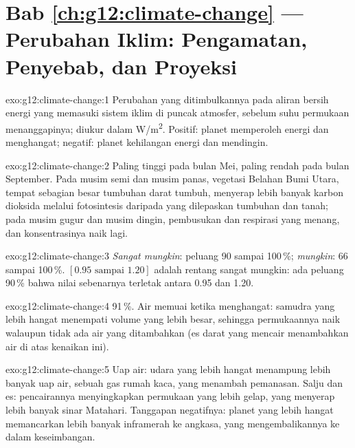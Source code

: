 \section*{Bab \ref{ch:g12:climate-change} --- Perubahan Iklim: Pengamatan, Penyebab, dan Proyeksi}

\begin{solution}{exo:g12:climate-change:1}
Perubahan yang ditimbulkannya pada aliran bersih energi yang memasuki sistem
iklim di puncak atmosfer, sebelum suhu permukaan menanggapinya; diukur dalam
\unit{W/m^2}. Positif: planet memperoleh energi dan menghangat; negatif:
planet kehilangan energi dan mendingin.
\end{solution}

\begin{solution}{exo:g12:climate-change:2}
Paling tinggi pada bulan Mei, paling rendah pada bulan September. Pada musim
semi dan musim panas, vegetasi Belahan Bumi Utara, tempat sebagian besar
tumbuhan darat tumbuh, menyerap lebih banyak karbon dioksida melalui
fotosintesis daripada yang dilepaskan tumbuhan dan tanah; pada musim gugur dan
musim dingin, pembusukan dan respirasi yang menang, dan konsentrasinya naik
lagi.
\end{solution}

\begin{solution}{exo:g12:climate-change:3}
\emph{Sangat mungkin}: peluang 90 sampai 100\,\%; \emph{mungkin}: 66 sampai
100\,\%. $[0.95 \text{ sampai } 1.20]$ adalah rentang sangat mungkin: ada peluang 90\,\% bahwa
nilai sebenarnya terletak antara 0.95 dan 1.20.
\end{solution}

\begin{solution}{exo:g12:climate-change:4}
91\,\%. Air memuai ketika menghangat: samudra yang lebih hangat menempati
volume yang lebih besar, sehingga permukaannya naik walaupun tidak ada air
yang ditambahkan (es darat yang mencair menambahkan air di atas kenaikan ini).
\end{solution}

\begin{solution}{exo:g12:climate-change:5}
Uap air: udara yang lebih hangat menampung lebih banyak uap air, sebuah gas
rumah kaca, yang menambah pemanasan. Salju dan es: pencairannya menyingkapkan
permukaan yang lebih gelap, yang menyerap lebih banyak sinar Matahari.
Tanggapan negatifnya: planet yang lebih hangat memancarkan lebih banyak
inframerah ke angkasa, yang mengembalikannya ke dalam keseimbangan.
\end{solution}

